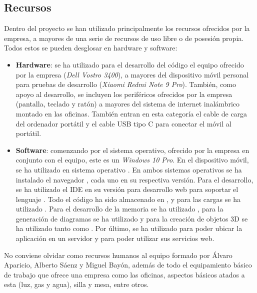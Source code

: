 \documentclass{subfiles}
\begin{document}

        \subsection{Recursos}
        \label{sec:recursos}

        Dentro del proyecto se han utilizado principalmente los recursos ofrecidos por la empresa, a mayores de una serie de recursos de uso libre o de posesión propia. Todos estos se pueden desglosar en hardware y software:

        \begin{itemize}
            \item \textbf{Hardware}: se ha utilizado para el desarrollo del código el equipo ofrecido por la empresa (\textit{Dell Vostro 3400}), a mayores del dispositivo móvil personal para pruebas de desarrollo (\textit{Xiaomi Redmi Note 9 Pro}). También, como apoyo al desarrollo, se incluyen los periféricos ofrecidos por la empresa (pantalla, teclado y ratón) a mayores del sistema de internet inalámbrico montado en las oficinas. También entran en esta categoría el cable de carga del ordenador portátil y el cable USB tipo C para conectar el móvil al portátil.
            \item \textbf{Software}: comenzando por el sistema operativo, ofrecido por la empresa en conjunto con el equipo, este es un \textit{Windows 10 Pro}. En el dispositivo móvil, se ha utilizado en sistema operativo \android. En ambos sistemas operativos se ha instalado el navegador \googlechrome, cada uno en su respectiva versión. Para el desarrollo, se ha utilizado el IDE \eclipse en su versión para desarrollo web para soportar el lenguaje \js. Todo el código ha sido almacenado en \github, y para las cargas se ha utilizado \gitkraken. Para el desarrollo de la memoria se ha utilizado \overleaf, para la generación de diagramas se ha utilizado \drawio y para la creación de objetos 3D se ha utilizado tanto \blender como \makehuman. Por último, se ha utilizado \aws para poder ubicar la aplicación en un servidor y para poder utilizar sus servicios web.
        \end{itemize}

        No conviene olvidar como recursos humanos al equipo formado por Álvaro Aparicio, Alberto Sáenz y Miguel Bayón, además de todo el equipamiento básico de trabajo que ofrece una empresa como las oficinas, aspectos básicos atados a esta (luz, gas y agua), silla y mesa, entre otros.
\end{document}

